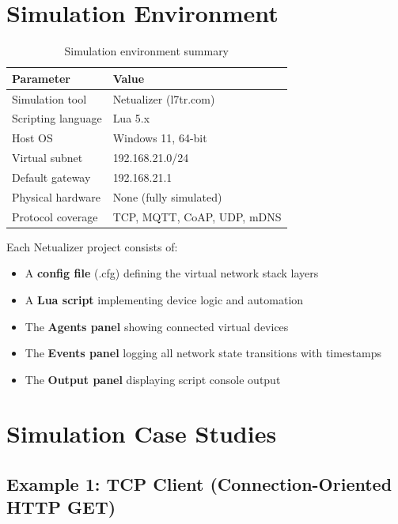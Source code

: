 \documentclass[12pt,a4paper]{article}
\begin{document}
\section{Simulation Environment}
\label{sec:env}

\begin{table}[H]
\centering
\caption{Simulation environment summary}
\label{tab:env}
\begin{tabular}{ll}
\toprule
\textbf{Parameter} & \textbf{Value} \\
\midrule
Simulation tool     & Netualizer (l7tr.com) \\
Scripting language  & Lua 5.x \\
Host OS             & Windows 11, 64-bit \\
Virtual subnet      & 192.168.21.0/24 \\
Default gateway     & 192.168.21.1 \\
Physical hardware   & None (fully simulated) \\
Protocol coverage   & TCP, MQTT, CoAP, UDP, mDNS \\
\bottomrule
\end{tabular}
\end{table}

Each Netualizer project consists of:
\begin{itemize}[nosep]
  \item A \textbf{config file} (.cfg) defining the virtual network stack layers
  \item A \textbf{Lua script} implementing device logic and automation
  \item The \textbf{Agents panel} showing connected virtual devices
  \item The \textbf{Events panel} logging all network state transitions with timestamps
  \item The \textbf{Output panel} displaying script console output
\end{itemize}

\section{Simulation Case Studies}
\label{sec:cases}

\subsection{Example 1: TCP Client (Connection-Oriented HTTP GET)}
\label{sec:tcp}
\end{document}
